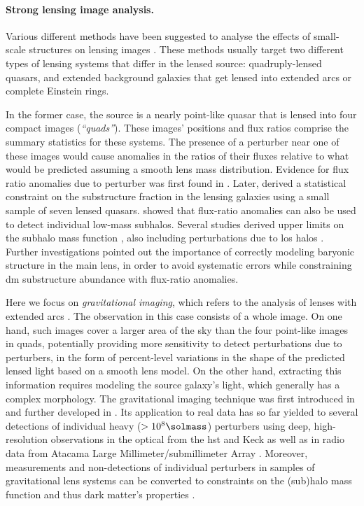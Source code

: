 \paragraph*{Strong lensing image analysis.}Various different methods have been suggested to analyse the effects of small-scale structures on lensing images \citep{Drlica-Wagner:2019aa}. These methods usually target two different types of lensing systems that differ in the lensed source: quadruply-lensed quasars, and extended background galaxies that get lensed into extended arcs or complete Einstein rings.

In the former case, the source is a nearly point-like quasar that is lensed into four compact images  (\emph{``quads''}). These images' positions and flux ratios comprise the summary statistics for these systems. The presence of a perturber near one of these images would cause anomalies in the ratios of their fluxes relative to what would be predicted assuming a smooth lens mass distribution. Evidence for flux ratio anomalies due to perturber was first found in \cite{Mao:1997ek}. Later, \cite{Dalal:2001fq} derived a statistical constraint on the substructure fraction in the lensing galaxies using a small sample of seven lensed quasars. \cite{Nierenberg:2014cga} showed that flux-ratio anomalies can also be used to detect individual low-mass subhalos. Several studies derived upper limits on the subhalo mass function %
\citep{Nierenberg:2017vlg}, also including perturbations due to \gls*{los} halos \citep{Gilman:2017voy, Gilman:2019nap}. Further investigations \citep{Hsueh:2016aih, Hsueh:2017zfs, Hsueh:2019ynk} pointed out the importance of correctly modeling baryonic structure in the main lens, in order to avoid systematic errors while constraining \gls*{dm} substructure abundance with flux-ratio anomalies. 

Here we focus on \emph{gravitational imaging}, which refers to the analysis of lenses with extended arcs \citep{Koopmans:2005ig,Vegetti:2008eg,Vegetti:2009gw}. The observation in this case consists of a whole image. On one hand, such images cover a larger area of the sky than the four point-like images in quads, potentially providing more sensitivity to detect perturbations due to perturbers, in the form of percent-level variations in the shape of the predicted lensed light based on a smooth lens model. On the other hand, extracting this information requires modeling the source galaxy's light, which generally has a complex morphology. The gravitational imaging technique was first introduced in \cite{Koopmans:2005nr} and further developed in \cite{Vegetti:2008eg, Vegetti:2009gw}. Its application to real data  has so far yielded to several detections of individual heavy ($>10^8 \si{\solmass}$) perturbers using deep, high-resolution observations in the optical from the \gls*{hst} and Keck as well as in radio data from Atacama Large Millimeter/submillimeter Array \citep{Vegetti:2010wa, Vegetti:2009cz, Vegetti:2012mc, Hezaveh:2016ltk,Diego:2022mii}. Moreover, measurements and non-detections of individual perturbers in samples of gravitational lens systems can be converted to constraints on the (sub)halo mass function and thus dark matter's properties \cite{Vegetti:2014lqa, Vegetti:2018dly,Ritondale:2018cvp}.

